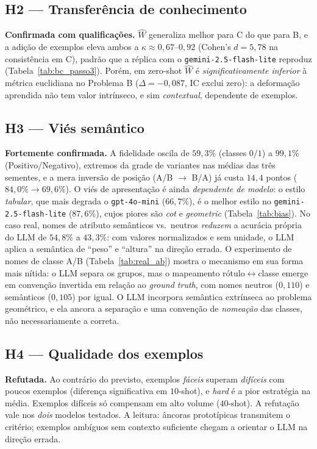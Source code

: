 \documentclass[12pt,a4paper]{article}
\newcommand{\West}{\ensuremath{\hat{W}}}   %
\begin{document}
\subsection{H2 — Transferência de conhecimento}
\textbf{Confirmada com qualificações.} \West{} generaliza melhor para C do que para B, e a
adição de exemplos eleva ambos a $\kappa \approx 0{,}67$–$0{,}92$ (Cohen's $d = 5{,}78$ na
consistência em C), padrão que a réplica com o \texttt{gemini-2.5-flash-lite} reproduz
(Tabela~\ref{tab:bc_passo3}). Porém, em zero-shot \West{} é \emph{significativamente inferior} à
métrica euclidiana no Problema B ($\Delta = -0{,}087$, IC exclui zero): a deformação
aprendida não tem valor intrínseco, e sim \emph{contextual}, dependente de exemplos.

\subsection{H3 — Viés semântico}
\textbf{Fortemente confirmada.} A fidelidade oscila de $59{,}3\%$ (classes $0/1$) a
$99{,}1\%$ (Positivo/Negativo), extremos da grade de variantes nas médias das três
sementes, e a
mera inversão de posição (A/B $\to$ B/A) já custa $14{,}4$ pontos ($84{,}0\% \to 69{,}6\%$).
O viés de apresentação é ainda \emph{dependente de modelo}: o estilo \emph{tabular}, que
mais degrada o \texttt{gpt-4o-mini} ($66{,}7\%$), é o melhor estilo no
\texttt{gemini-2.5-flash-lite} ($87{,}6\%$), cujos piores são \emph{cot} e
\emph{geometric} (Tabela~\ref{tab:bias}).
No caso real, nomes de atributo semânticos vs.\ neutros \emph{reduzem} a acurácia própria
do LLM de $54{,}8\%$ a $43{,}3\%$: com valores normalizados e sem unidade, o LLM aplica a
semântica de ``peso'' e ``altura'' na direção errada. O experimento de nomes de classe A/B
(Tabela~\ref{tab:real_ab}) mostra o mecanismo em sua forma mais nítida: o LLM separa os
grupos, mas o mapeamento rótulo$\leftrightarrow$classe emerge em convenção invertida em
relação ao \emph{ground truth}, com nomes neutros ($0{,}110$) e semânticos ($0{,}105$) por
igual. O LLM incorpora semântica extrínseca ao problema geométrico, e ela ancora a
separação e uma convenção de \emph{nomeação} das classes, não necessariamente a correta.

\subsection{H4 — Qualidade dos exemplos}
\textbf{Refutada.} Ao contrário do previsto, exemplos \emph{fáceis} superam \emph{difíceis}
com poucos exemplos (diferença significativa em $10$-shot), e \emph{hard} é a pior
estratégia na média. Exemplos difíceis só compensam em alto volume ($40$-shot). A refutação
vale nos \emph{dois} modelos testados. A leitura: âncoras prototípicas transmitem o critério;
exemplos ambíguos sem contexto suficiente chegam a orientar o LLM na direção errada.
\end{document}
